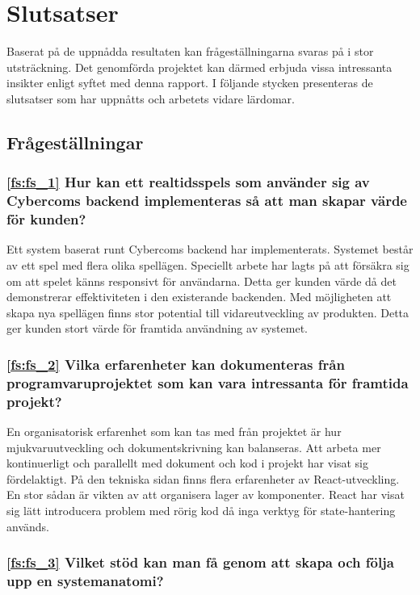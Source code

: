 \chapter{Slutsatser}
\label{cha:slutsatser}

Baserat på de uppnådda resultaten kan frågeställningarna svaras på i stor utsträckning. Det genomförda projektet kan därmed erbjuda vissa intressanta insikter enligt syftet med denna rapport. I följande stycken presenteras de slutsatser som har uppnåtts och arbetets vidare lärdomar.

\section{Frågeställningar}

\subsection*{\ref{fs:fs_1} Hur kan ett realtidsspels som använder sig av Cybercoms backend implementeras så att man skapar värde för kunden?}

Ett system baserat runt Cybercoms backend har implementerats. Systemet består av ett spel med flera olika spellägen. Speciellt arbete har lagts på att försäkra sig om att spelet känns responsivt för användarna. Detta ger kunden värde då det demonstrerar effektiviteten i den existerande backenden.
Med möjligheten att skapa nya spellägen finns stor potential till vidareutveckling av produkten. Detta ger kunden stort värde för framtida användning av systemet.

\subsection*{\ref{fs:fs_2} Vilka erfarenheter kan dokumenteras från programvaruprojektet som kan vara intressanta för framtida projekt?}

En organisatorisk erfarenhet som kan tas med från projektet är hur mjukvaruutveckling och dokumentskrivning kan balanseras. Att arbeta mer kontinuerligt och parallellt med dokument och kod i projekt har visat sig fördelaktigt. På den tekniska sidan finns flera erfarenheter av React-utveckling. En stor sådan är vikten av att organisera lager av komponenter. React har visat sig lätt introducera problem med rörig kod då inga verktyg för state-hantering används.

\subsection*{\ref{fs:fs_3} Vilket stöd kan man få genom att skapa och följa upp en systemanatomi?}

